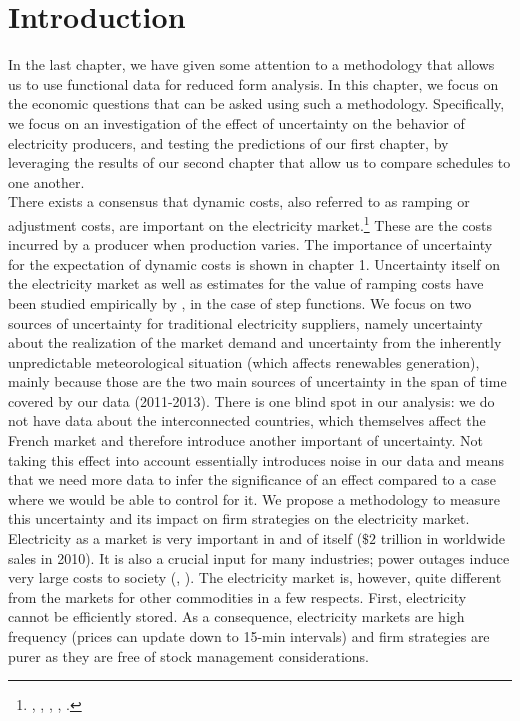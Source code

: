 \doublespacing
\section{Introduction}
In the last chapter, we have given some attention to a methodology that allows us to use functional data for reduced form analysis. In this chapter, we focus on the economic questions that can be asked using such a methodology. Specifically, we focus on an investigation of the effect of uncertainty on the behavior of electricity producers, and testing the predictions of our first chapter, by leveraging the results of our second chapter that allow us to compare schedules to one another. \\

There exists a consensus that dynamic costs, also referred to as ramping or adjustment costs, are important on the electricity market.\footnote{ \cite{anderson2005supply},  \cite{hobbs2001next}, \cite{hortacsu2008understanding}, \cite{reguant2011welfare}, \cite{sewalt2003negative}. } These are the costs incurred by a producer when production varies. The importance of uncertainty for the expectation of dynamic costs is shown in chapter 1. Uncertainty itself on the electricity market as well as estimates for the value of ramping costs have been studied empirically by \cite{wolak2007quantifying}, in the case of step functions. We focus on two sources of uncertainty for traditional electricity suppliers, namely uncertainty about the realization of the market demand and uncertainty from the inherently unpredictable meteorological situation (which affects renewables generation), mainly because those are the two main sources of uncertainty in the span of time covered by our data (2011-2013). There is one blind spot in our analysis: we do not have data about the interconnected countries, which themselves affect the French market and therefore introduce another important of uncertainty. Not taking this effect into account essentially introduces noise in our data and means that we need more data to infer the significance of an effect compared to a case where we would be able to control for it. We propose a methodology to measure this uncertainty and its impact on firm strategies on the electricity market. \\

Electricity as a market is very important in and of itself ($\$2$ trillion in worldwide sales in 2010). It is also a crucial input for many industries; power outages induce very large costs to society (\cite{lacommare2004understanding}, \cite{reichl2013power}). The electricity market is, however, quite different from the markets for other commodities in a few respects. First, electricity cannot be efficiently stored. As a consequence, electricity markets are high frequency (prices can update down to 15-min intervals) and firm strategies are purer as they are free of stock management considerations. \\

